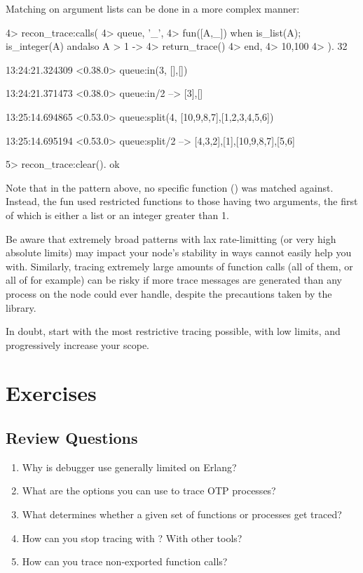Matching on argument lists can be done in a more complex manner:

\begin{VerbatimEshell}
4> recon_trace:calls(
4>   {queue, '_',
4>    fun([A,_]) when is_list(A); is_integer(A) andalso A > 1 ->
4>        return_trace()
4>    end},
4>   {10,100}
4> ).
32

13:24:21.324309 <0.38.0> queue:in(3, {[],[]})

13:24:21.371473 <0.38.0> queue:in/2 --> {[3],[]}

13:25:14.694865 <0.53.0> queue:split(4, {[10,9,8,7],[1,2,3,4,5,6]})

13:25:14.695194 <0.53.0> queue:split/2 --> {{[4,3,2],[1]},{[10,9,8,7],[5,6]}}

5> recon_trace:clear().
ok
\end{VerbatimEshell}

Note that in the pattern above, no specific function () was matched against. Instead, the fun used restricted functions to those having two arguments, the first of which is either a list or an integer greater than 1.

Be aware that extremely broad patterns with lax rate-limitting (or very high absolute limits) may impact your node's stability in ways  cannot easily help you with. Similarly, tracing extremely large amounts of function calls (all of them, or all of  for example) can be risky if more trace messages are generated than any process on the node could ever handle, despite the precautions taken by the library.

In doubt, start with the most restrictive tracing possible, with low limits, and progressively increase your scope.


\section{Exercises}

\subsection*{Review Questions}

\begin{enumerate}
	\item Why is debugger use generally limited on Erlang?
	\item What are the options you can use to trace OTP processes?
	\item What determines whether a given set of functions or processes get traced?
	\item How can you stop tracing with ? With other tools?
	\item How can you trace non-exported function calls?
\end{enumerate}

